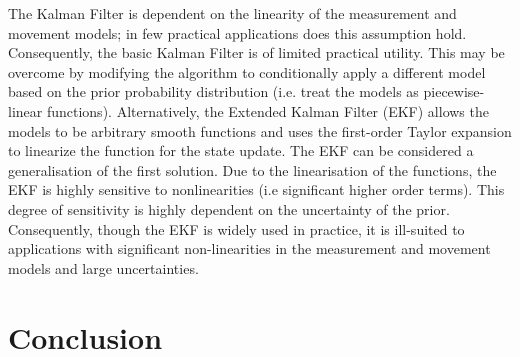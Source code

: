 \documentclass[english]{article}
\begin{document}
The Kalman Filter is dependent on the linearity of the measurement and movement models; in few practical applications does this assumption hold. Consequently, the basic Kalman Filter is of limited practical utility. This may be overcome by  modifying the algorithm to conditionally apply a different model based on the prior probability distribution (i.e. treat the models as piecewise-linear functions). Alternatively, the Extended Kalman Filter (EKF) allows the models to be arbitrary smooth functions and uses the first-order Taylor expansion to linearize the function for the state update. The EKF can be considered a generalisation of the first solution. Due to the linearisation of the functions, the EKF is highly sensitive to nonlinearities (i.e significant higher order terms). This degree of sensitivity is highly dependent on the uncertainty of the prior\cite{probrob}. Consequently, though the EKF is widely used in practice\cite{probrob}, it is ill-suited to applications with significant non-linearities in the measurement and movement models and large uncertainties.




\section{Conclusion}



\end{document}
